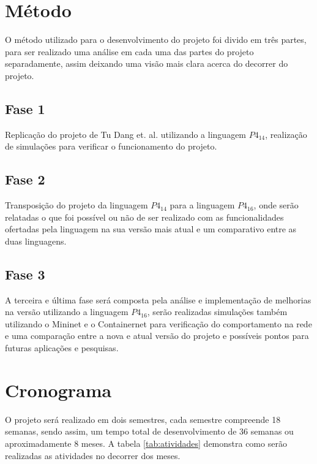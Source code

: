 \documentclass[12pt,
openright, 
oneside,
a4paper,
brazil]{facom-ufu-abntex2}
\theoremstyle{definition}
\begin{document}
\section{Método}
O método utilizado para o desenvolvimento do projeto foi divido em três partes, para
ser realizado uma análise em cada uma das partes do projeto separadamente, assim deixando uma
visão mais clara acerca do decorrer do projeto.

\subsection{Fase 1}
Replicação do projeto de Tu Dang et. al. \citep{dang2016paxos} utilizando a linguagem 
$P4_{14}$, realização de simulações para verificar o funcionamento do projeto.

\subsection{Fase 2}
Transposição do projeto da linguagem $P4_{14}$ para a linguagem $P4_{16}$, onde serão relatadas
o que foi possível ou não de ser realizado com as funcionalidades ofertadas pela linguagem na
sua versão mais atual e um comparativo entre as duas linguagens.

\subsection{Fase 3}
A terceira e última fase será composta pela análise e implementação de melhorias na versão
utilizando a linguagem $P4_{16}$, serão realizadas simulações também utilizando o Mininet
e o Containernet para verificação do comportamento na rede e uma comparação entre a nova 
e atual versão do projeto e possíveis pontos para futuras aplicações e pesquisas.

\section{Cronograma}
O projeto será realizado em dois semestres, cada semestre compreende 18 semanas, sendo assim,
um tempo total de desenvolvimento de 36 semanas ou aproximadamente 8 meses. A tabela 
\ref{tab:atividades} demonstra como serão realizadas as atividades no decorrer dos meses. 
\end{document}
